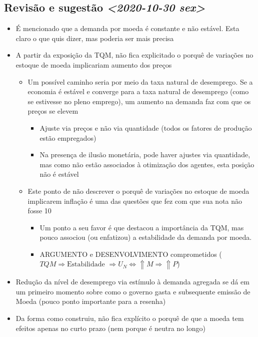 \documentclass[11pt]{article}
\begin{document}
\subsection*{Revisão e sugestão \textit{<2020-10-30 sex>}}
\label{sec:org928f2c1}

\begin{itemize}
\item É mencionado que a demanda por moeda é constante e não estável. Esta claro o que quis dizer, mas poderia ser mais precisa
\item A partir da exposição da TQM, não fica explicitado o porquê de variações no estoque de moeda implicariam aumento dos preços
\begin{itemize}
\item Um possível caminho seria por meio da taxa natural de desemprego. Se a economia é estável e converge para a taxa natural de desemprego (como se estivesse no pleno emprego), um aumento na demanda faz com que os preços se elevem
\begin{itemize}
\item Ajuste via preços e não via quantidade (todos os fatores de produção estão empregados)
\item Na presença de ilusão monetária, pode haver ajustes via quantidade, mas como não estão associados à otimização dos agentes, esta posição não é estável
\end{itemize}
\item Este ponto de não descrever o porquê de variações no estoque de moeda implicarem inflação é uma das questões que fez com que sua nota não fosse 10
\begin{itemize}
\item Um ponto a seu favor é que destacou a importância da TQM, mas pouco associou (ou enfatizou) a estabilidade da demanda por moeda.
\item ARGUMENTO e DESENVOLVIMENTO comprometidos (\(TQM \Rightarrow \text{Estabilidade } \Rightarrow U_N \Leftrightarrow \Uparrow M \Rightarrow \Uparrow P\))
\end{itemize}
\end{itemize}
\item Redução da nível de desemprego via estímulo à demanda agregada se dá em um primeiro momento sobre como o governo gasta e subsequente emissão de Moeda (pouco ponto importante para a resenha)
\item Da forma como construiu, não fica explícito o porquê de que a moeda tem efeitos apenas no curto prazo (nem porque é neutra no longo)
\begin{itemize}

\end{itemize}
\end{itemize}
\end{document}
